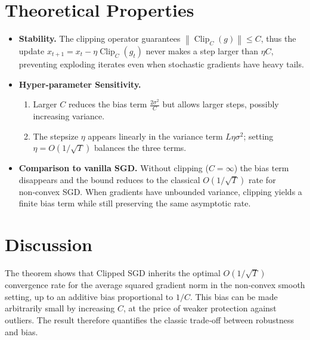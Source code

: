 \documentclass[11pt]{article}
\newcommand{\norm}[1]{\left\lVert#1\right\rVert}
\begin{document}
\section*{Theoretical Properties}
\begin{itemize}
\item \textbf{Stability.} The clipping operator guarantees $\norm{\operatorname{Clip}_C(g)}\le C$, thus the update $x_{t+1}=x_t-\eta\operatorname{Clip}_C(g_t)$ never makes a step larger than $\eta C$, preventing exploding iterates even when stochastic gradients have heavy tails.
\item \textbf{Hyper‑parameter Sensitivity.} 
    \begin{enumerate}
        \item Larger $C$ reduces the bias term $\tfrac{2\sigma^2}{C}$ but allows larger steps, possibly increasing variance.
        \item The stepsize $\eta$ appears linearly in the variance term $L\eta\sigma^2$; setting $\eta=O(1/\sqrt{T})$ balances the three terms.
    \end{enumerate}
\item \textbf{Comparison to vanilla SGD.} Without clipping ($C=\infty$) the bias term disappears and the bound reduces to the classical $O(1/\sqrt{T})$ rate for non‑convex SGD. When gradients have unbounded variance, clipping yields a finite bias term while still preserving the same asymptotic rate.
\end{itemize}

\section*{Discussion}
The theorem shows that Clipped SGD inherits the optimal $O(1/\sqrt{T})$ convergence rate for the average squared gradient norm in the non‑convex smooth setting, up to an additive bias proportional to $1/C$. This bias can be made arbitrarily small by increasing $C$, at the price of weaker protection against outliers. The result therefore quantifies the classic trade‑off between robustness and bias.

\newpage
\end{document}
